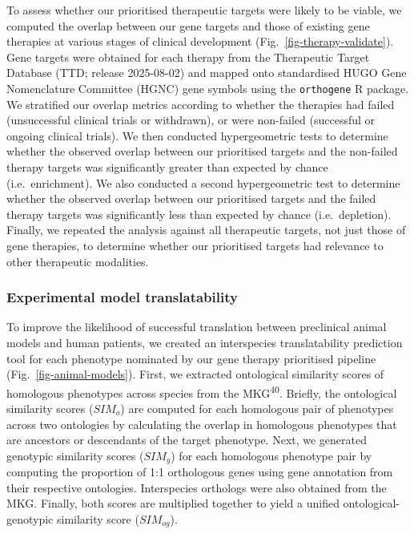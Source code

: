 \documentclass[
]{article}
\begin{document}
To assess whether our prioritised therapeutic targets were likely to be
viable, we computed the overlap between our gene targets and those of
existing gene therapies at various stages of clinical development
(Fig.~\ref{fig-therapy-validate}). Gene targets were obtained for each
therapy from the Therapeutic Target Database (TTD; release 2025-08-02)
and mapped onto standardised HUGO Gene Nomenclature Committee (HGNC)
gene symbols using the \texttt{orthogene} R package. We stratified our
overlap metrics according to whether the therapies had failed
(unsuccessful clinical trials or withdrawn), or were non-failed
(successful or ongoing clinical trials). We then conducted
hypergeometric tests to determine whether the observed overlap between
our prioritised targets and the non-failed therapy targets was
significantly greater than expected by chance (i.e.~enrichment). We also
conducted a second hypergeometric test to determine whether the observed
overlap between our prioritised targets and the failed therapy targets
was significantly less than expected by chance (i.e.~depletion).
Finally, we repeated the analysis against all therapeutic targets, not
just those of gene therapies, to determine whether our prioritised
targets had relevance to other therapeutic modalities.

\subsubsection{Experimental model
translatability}\label{experimental-model-translatability-1}

To improve the likelihood of successful translation between preclinical
animal models and human patients, we created an interspecies
translatability prediction tool for each phenotype nominated by our gene
therapy prioritised pipeline (Fig.~\ref{fig-animal-models}). First, we
extracted ontological similarity scores of homologous phenotypes across
species from the MKG\textsuperscript{40}. Briefly, the ontological
similarity scores (\(SIM_o\)) are computed for each homologous pair of
phenotypes across two ontologies by calculating the overlap in
homologous phenotypes that are ancestors or descendants of the target
phenotype. Next, we generated genotypic similarity scores (\(SIM_g\))
for each homologous phenotype pair by computing the proportion of 1:1
orthologous genes using gene annotation from their respective
ontologies. Interspecies orthologs were also obtained from the MKG.
Finally, both scores are multiplied together to yield a unified
ontological-genotypic similarity score (\(SIM_{og}\)).
\end{document}
